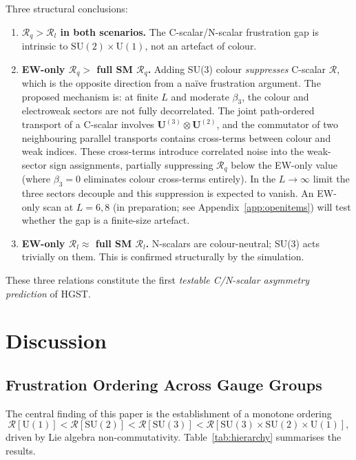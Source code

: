 \documentclass[12pt,a4paper]{article}
\newcommand{\R}{\mathcal{R}}           %
\newcommand{\SU}[1]{\mathrm{SU}(#1)}
\newcommand{\UN}[1]{\mathrm{U}(#1)}
\newcommand{\SM}{\SU{3}\!\times\!\SU{2}\!\times\!\UN{1}}
\theoremstyle{plain}
\theoremstyle{definition}
\theoremstyle{remark}
\begin{document}
Three structural conclusions:
\begin{enumerate}
  \item \textbf{$\R_q>\R_l$ in both scenarios.}
        The C-scalar/N-scalar frustration gap is intrinsic to $\SU{2}\times\UN{1}$,
        not an artefact of colour.
  \item \textbf{EW-only $\R_q >$ full SM $\R_q$.}
        Adding SU(3) colour \emph{suppresses} C-scalar $\R$, which is the opposite
        direction from a naïve frustration argument.
        The proposed mechanism is: at finite $L$ and moderate $\beta_3$, the
        colour and electroweak sectors are not fully decorrelated.  The joint
        path-ordered transport of a C-scalar involves
        $\mathbf{U}^{(3)}\otimes\mathbf{U}^{(2)}$, and the commutator of two
        neighbouring parallel transports contains cross-terms between colour and
        weak indices.  These cross-terms introduce correlated noise into the
        weak-sector sign assignments, partially suppressing $\R_q$ below the
        EW-only value (where $\beta_3=0$ eliminates colour cross-terms entirely).
        In the $L\to\infty$ limit the three sectors decouple and this suppression
        is expected to vanish.  An EW-only scan at $L=6,8$ (in preparation;
        see Appendix~\ref{app:openitems}) will test whether the gap is a
        finite-size artefact.
  \item \textbf{EW-only $\R_l \approx$ full SM $\R_l$.}
        N-scalars are colour-neutral; SU(3) acts trivially on them.
        This is confirmed structurally by the simulation.
\end{enumerate}
These three relations constitute the first \emph{testable C/N-scalar asymmetry
prediction} of HGST.

\section{Discussion}
\label{sec:discussion}

\subsection{Frustration Ordering Across Gauge Groups}

The central finding of this paper is the establishment of a monotone ordering
\begin{equation}
  \R[\UN{1}] < \R[\SU{2}] < \R[\SU{3}] < \R[\SM],
  \label{eq:hierarchy}
\end{equation}
driven by Lie algebra non-commutativity.
Table~\ref{tab:hierarchy} summarises the results.
\end{document}
